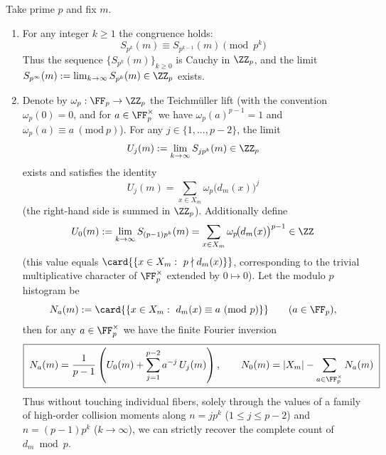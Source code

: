 \begin{proposition}\label{prop:pom-collision-moment-ptypical-congruence-teichmuller-histogram}
Take prime \(p\) and fix \(m\).
\begin{enumerate}
  \item For any integer \(k\ge 1\) the congruence holds:
  \[
  \boxed{\;
  S_{p^k}(m)\equiv S_{p^{k-1}}(m)\pmod{p^k}\;}
  \]
  Thus the sequence \(\{S_{p^k}(m)\}_{k\ge 0}\) is Cauchy in \(\ZZ_p\), and the limit
  \(
  S_{p^\infty}(m):=\lim_{k\to\infty}S_{p^k}(m)\in\ZZ_p
  \)
  exists.
  \item Denote by \(\omega_p:\FF_p\to\ZZ_p\) the Teichm\"uller lift (with the convention \(\omega_p(0)=0\), and for \(a\in\FF_p^\times\) we have \(\omega_p(a)^{p-1}=1\) and \(\omega_p(a)\equiv a\ (\mathrm{mod}\ p)\)).
  For any \(j\in\{1,\dots,p-2\}\), the limit
  \[
  U_j(m):=\lim_{k\to\infty}S_{j p^k}(m)\in\ZZ_p
  \]
  exists and satisfies the identity
  \[
  \boxed{\;
  U_j(m)=\sum_{x\in X_m}\omega_p\!\bigl(d_m(x)\bigr)^j\;}
  \]
  (the right-hand side is summed in \(\ZZ_p\)).
  Additionally define
  \[
  U_0(m):=\lim_{k\to\infty}S_{(p-1)p^k}(m)=\sum_{x\in X_m}\omega_p\!\bigl(d_m(x)\bigr)^{p-1}\in\ZZ
  \]
  (this value equals \(\card{\{x\in X_m:\ p\nmid d_m(x)\}}\), corresponding to the trivial multiplicative character of \(\FF_p^\times\) extended by \(0\mapsto 0\)).
  Let the modulo \(p\) histogram be
  \[
  N_a(m):=\card{\{x\in X_m:\ d_m(x)\equiv a\ (\mathrm{mod}\ p)\}}\qquad(a\in\FF_p),
  \]
  then for any \(a\in\FF_p^\times\) we have the finite Fourier inversion
  \[
  \boxed{\;
  N_a(m)=\frac{1}{p-1}\left(U_0(m)+\sum_{j=1}^{p-2}a^{-j}\,U_j(m)\right),\qquad
  N_0(m)=|X_m|-\sum_{a\in\FF_p^\times}N_a(m)\;}
  \]
  Thus without touching individual fibers, solely through the values of a family of high-order collision moments along \(n=j p^k\) (\(1\le j\le p-2\)) and \(n=(p-1)p^k\) (\(k\to\infty\)), we can strictly recover the complete count of \(d_m\bmod p\).
\end{enumerate}
\end{proposition}
